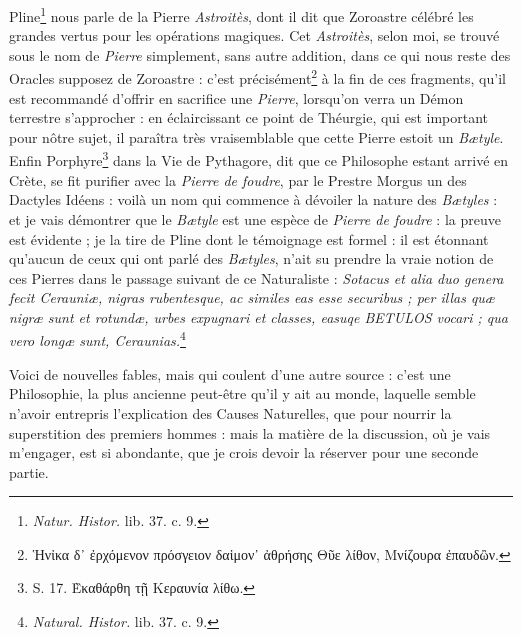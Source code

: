 \documentclass[a4paper, 11pt, oneside, polutonikogreek, french]{article}
\begin{document}
Pline\footnote{\emph{Natur. Histor.} lib. 37. c. 9.} nous parle de la Pierre \emph{Astroitès}, dont il dit que Zoroastre célébré les grandes vertus pour les opérations magiques. Cet \emph{Astroitès}, selon moi, se trouvé sous le nom de \emph{Pierre} simplement, sans autre addition, dans ce qui nous reste des Oracles supposez de Zoroastre : c'est précisément\footnote{Ἡνἰκα δ᾽ ἐρχόμενον πρόσγειον δαἱμον᾽ ἀθρήσης Θῦε λίθον, Μνίζουρα ἐπαυδὢν.} à la fin de ces fragments, qu'il est recommandé d'offrir en sacrifice une \emph{Pierre}, lorsqu'on verra un Démon terrestre s'approcher : en éclaircissant ce point de Théurgie, qui est important pour nôtre sujet, il paraîtra très vraisemblable que cette Pierre estoit un \emph{Bætyle}. Enfin Porphyre\footnote{S. 17. Ὲκαθάρθη τῇ Κεραυνία λίθω.} dans la Vie de Pythagore, dit que ce Philosophe estant arrivé en Crète, se fit purifier avec la \emph{Pierre de foudre}, par le Prestre Morgus un des Dactyles Idéens : voilà un nom qui commence à dévoiler la nature des \emph{Bætyles} : et je vais démontrer que le \emph{Bætyle} est une espèce de \emph{Pierre de foudre} : la preuve est évidente ; je la tire de Pline dont le témoignage est formel : il est étonnant qu'aucun de ceux qui ont parlé des \emph{Bætyles}, n'ait su prendre la vraie notion de ces Pierres dans le passage suivant de ce Naturaliste : \emph{Sotacus et alia duo genera fecit Cerauniæ, nigras rubentesque, ac similes eas esse securibus ; per illas quæ nigræ sunt et rotundæ, urbes expugnari et classes, easuqe BETULOS vocari ; qua vero longæ sunt, Ceraunias.}\footnote{\emph{Natural. Histor.} lib. 37. c. 9.}

Voici de nouvelles fables, mais qui coulent d'une autre source : c'est une Philosophie, la plus ancienne peut-être qu'il y ait au monde, laquelle semble n'avoir entrepris l'explication des Causes Naturelles, que pour nourrir la superstition des premiers hommes : mais la matière de la discussion, où je vais m'engager, est si abondante, que je crois devoir la réserver pour une seconde partie.
\clearpage
\end{document}
